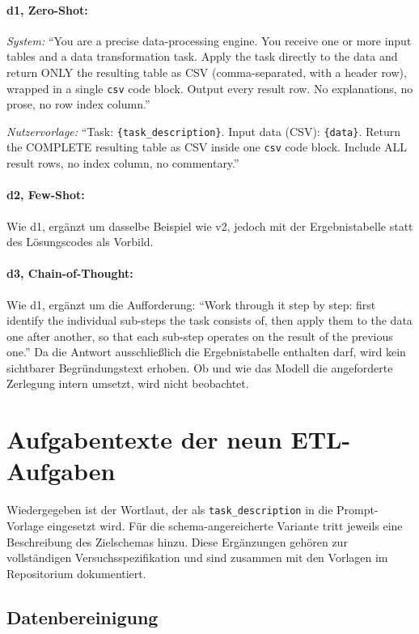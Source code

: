 \paragraph{d1, Zero-Shot:}
\emph{System:} \enquote{You are a precise data-processing engine. You receive
one or more input tables and a data transformation task. Apply the task directly
to the data and return ONLY the resulting table as CSV (comma-separated, with a
header row), wrapped in a single \texttt{csv} code block. Output every result
row. No explanations, no prose, no row index column.}

\emph{Nutzervorlage:} \enquote{Task: \texttt{\{task\_description\}}. Input data
(CSV): \texttt{\{data\}}. Return the COMPLETE resulting table as CSV inside one
\texttt{csv} code block. Include ALL result rows, no index column, no
commentary.}

\paragraph{d2, Few-Shot:}
Wie d1, ergänzt um dasselbe Beispiel wie v2, jedoch mit der Ergebnistabelle
statt des Lösungscodes als Vorbild.

\paragraph{d3, Chain-of-Thought:}
Wie d1, ergänzt um die Aufforderung: \enquote{Work through it step by step:
first identify the individual sub-steps the task consists of, then apply them to
the data one after another, so that each sub-step operates on the result of the
previous one.} Da die Antwort ausschließlich die Ergebnistabelle enthalten darf,
wird kein sichtbarer Begründungstext erhoben. Ob und wie das Modell die angeforderte Zerlegung intern umsetzt, wird nicht beobachtet.

\section{Aufgabentexte der neun ETL-Aufgaben}
\label{apx:aufgaben}

Wiedergegeben ist der Wortlaut, der als \texttt{task\_description} in die
Prompt-Vorlage eingesetzt wird. Für die schema-angereicherte Variante tritt
jeweils eine Beschreibung des Zielschemas hinzu. Diese Ergänzungen gehören zur vollständigen Versuchsspezifikation und sind zusammen mit den Vorlagen im Repositorium dokumentiert.

\subsection*{Datenbereinigung}

